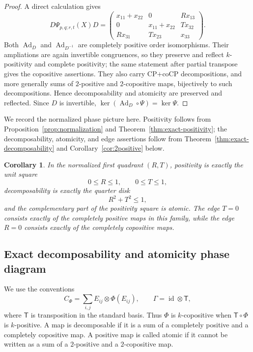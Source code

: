 \documentclass[11pt]{amsart}
\newcommand{\chg}[1]{#1}
\newcommand{\Ad}{\operatorname{Ad}}
\theoremstyle{plain}
\newtheorem{corollary}[theorem]{Corollary}
\theoremstyle{definition}
\theoremstyle{remark}
\begin{document}
\begin{proof}
A direct calculation gives
\[
D\Psi_{p,q;r,t}(X)D=
\begin{pmatrix}
x_{11}+x_{22}&0&R x_{13}\\
0&x_{11}+x_{22}&T x_{32}\\
R x_{31}&T x_{23}&x_{33}
\end{pmatrix}.
\]
Both $\Ad_D$ and $\Ad_{D^{-1}}$ are completely positive order isomorphisms. Their ampliations are again invertible congruences, so they preserve and reflect $k$-positivity and complete positivity; the same statement after partial transpose gives the copositive assertions. They also carry CP$+$coCP decompositions, and more generally sums of $2$-positive and $2$-copositive maps, bijectively to such decompositions. Hence decomposability and atomicity are preserved and reflected. Since $D$ is invertible, $\ker(\Ad_D\circ\Psi)=\ker\Psi$.
\end{proof}

{We record the normalized phase picture here. Positivity follows from Proposition~\ref{prop:normalization} and Theorem~\ref{thm:exact-positivity}; the decomposability, atomicity, and edge assertions follow from Theorem~\ref{thm:exact-decomposability} and Corollary~\ref{cor:2positive} below.}

\begin{corollary}\label{cor:normalized-phase}
In the normalized first quadrant $(R,T)$, positivity is exactly the unit square
\[
0\le R\le1,\qquad0\le T\le1,
\]
decomposability is exactly the quarter disk
\[
R^2+T^2\le1,
\]
and the complementary part of the positivity square is atomic. \chg{The edge $T=0$ consists exactly of the completely positive maps in this family, while the edge $R=0$ consists exactly of the completely copositive maps.}
\end{corollary}

\subsection{Exact decomposability and atomicity phase diagram}

{
We use the conventions
\[
C_\Phi=\sum_{i,j}E_{ij}\otimes\Phi(E_{ij}),
\qquad
\Gamma=\operatorname{id}\otimes\mathsf T,
\]
where $\mathsf T$ is transposition in the standard basis. Thus $\Phi$ is $k$-copositive when $\mathsf T\circ\Phi$ is $k$-positive. A map is decomposable if it is a sum of a completely positive and a completely copositive map. A positive map is called atomic if it cannot be written as a sum of a $2$-positive and a $2$-copositive map.
}
\end{document}
